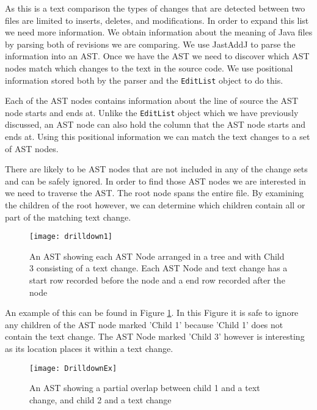 As this is a text comparison the types of changes that are detected between two files are limited to inserts, deletes, and modifications. In order to expand this list we need more information.  We obtain information about the meaning of Java files by parsing both of revisions we are comparing.  We use JastAddJ \cite{Oqvist2013} to parse the information into an AST. Once we have the AST we need to discover which AST nodes match which changes to the text in the source code. We use positional information stored both by the parser and the \lstinline{EditList} object to do this.

\label{sec:over} 
Each of the AST nodes contains information about the line of source the AST node starts and ends at.  Unlike the \lstinline{EditList} object which we have previously discussed, an AST node can also hold the column that the AST node starts and ends at.  Using this positional information we can match the text changes to a set of AST nodes.

There are likely to be AST nodes that are not included in any of the change sets and can be safely ignored. In order to find those AST nodes we are interested in we need to traverse the AST.  The root node spans the entire file.  By examining the children of the root however, we can determine which children contain all or part of the matching text change.

\begin{figure}[!t]
 \begin{center}
  \texttt{[image: drilldown1]}
 \end{center}
 \caption{An AST showing each AST Node arranged in a tree and with Child 3 consisting of a text change.  Each AST Node and text change has a start row recorded before the node and a end row recorded after the node}
 \label{fig:findingASTNode}
\end{figure}

An example of this can be found in Figure \ref{fig:findingASTNode}.  In this Figure it is safe to ignore any children of the AST node marked 'Child 1' because 'Child 1' does not contain the text change.  The AST Node marked 'Child 3' however is interesting as its location places it within a text change. 


\begin{figure}[!t]
 \begin{center}
  \texttt{[image: DrilldownEx]}
 \end{center}
 \caption{An AST showing a partial overlap between child 1 and a text change, and child 2 and a text change}
 \label{fig:troubleASTNode}
\end{figure}

